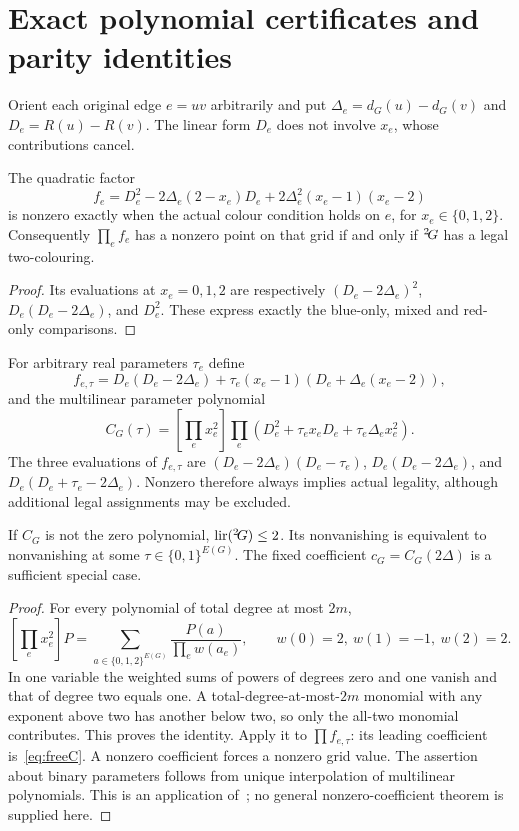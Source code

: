\section{Exact polynomial certificates and parity identities}\label{sec:algebra}

Orient each original edge $e=uv$ arbitrarily and put
$\Delta_e=d_G(u)-d_G(v)$ and $D_e=R(u)-R(v)$. The linear form
$D_e$ does not involve $x_e$, whose contributions cancel.

\begin{proposition}\label{prop:exactpoly}
The quadratic factor
\[
 f_e=D_e^2-2\Delta_e(2-x_e)D_e
       +2\Delta_e^2(x_e-1)(x_e-2)
\]
is nonzero exactly when the actual colour condition holds on $e$,
for $x_e\in\{0,1,2\}$. Consequently $\prod_e f_e$ has a nonzero
point on that grid if and only if ${}^{2}\!G$ has a legal two-colouring.
\end{proposition}
\begin{proof}
Its evaluations at $x_e=0,1,2$ are respectively
$(D_e-2\Delta_e)^2$, $D_e(D_e-2\Delta_e)$, and $D_e^2$.
These express exactly the blue-only, mixed and red-only comparisons.
\end{proof}

For arbitrary real parameters $\tau_e$ define
\[
 f_{e,\tau}=D_e(D_e-2\Delta_e)+
 \tau_e(x_e-1)(D_e+\Delta_e(x_e-2)),
\]
and the multilinear parameter polynomial
\begin{equation}\label{eq:freeC}
 C_G(\tau)=\left[\prod_e x_e^2\right]
 \prod_e(D_e^2+\tau_e x_eD_e+\tau_e\Delta_e x_e^2).
\end{equation}
The three evaluations of $f_{e,\tau}$ are
$(D_e-2\Delta_e)(D_e-\tau_e)$,
$D_e(D_e-2\Delta_e)$, and
$D_e(D_e+\tau_e-2\Delta_e)$. Nonzero therefore always implies
actual legality, although additional legal assignments may be excluded.

\begin{proposition}\label{prop:freecertificate}
If $C_G$ is not the zero polynomial, $\operatorname{lir}({}^{2}\!G)\le2$.
Its nonvanishing is equivalent to nonvanishing at some
$\tau\in\{0,1\}^{E(G)}$. The fixed coefficient
$c_G=C_G(2\Delta)$ is a sufficient special case.
\end{proposition}
\begin{proof}
For every polynomial of total degree at most $2m$,
\begin{equation}\label{eq:gridinterp}
 \left[\prod_e x_e^2\right]P
 =\sum_{a\in\{0,1,2\}^{E(G)}}
 \frac{P(a)}{\prod_e w(a_e)},\qquad
 w(0)=2,\ w(1)=-1,\ w(2)=2.
\end{equation}
In one variable the weighted sums of powers of degrees zero and one
vanish and that of degree two equals one. A total-degree-at-most-$2m$
monomial with any exponent above two has another below two, so only
the all-two monomial contributes. This proves the identity. Apply it
to $\prod f_{e,\tau}$: its leading coefficient is~\eqref{eq:freeC}.
A nonzero coefficient forces a nonzero grid value. The assertion
about binary parameters follows from unique interpolation of
multilinear polynomials. This is an application of~\cite{Alon99};
no general nonzero-coefficient theorem is supplied here.
\end{proof}

